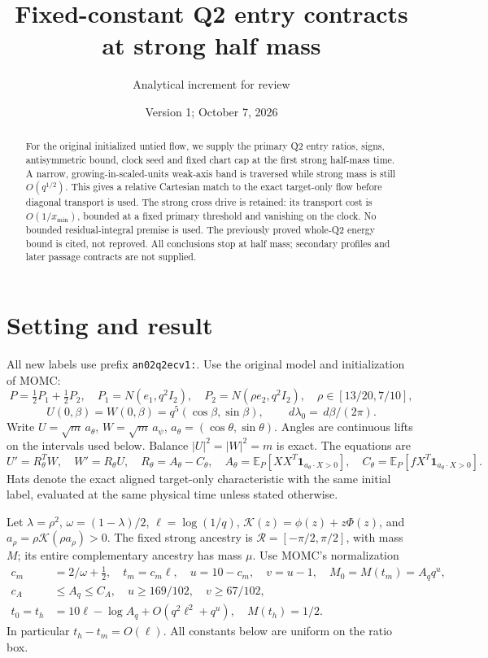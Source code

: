 \documentclass[11pt]{article}
\title{Fixed-constant Q2 entry contracts at strong half mass}
\author{Analytical increment for review}
\date{Version 1; October 7, 2026}
\theoremstyle{remark}\newtheorem{remark}[theorem]{Remark}
\newcommand{\dd}{\,d}
\newcommand{\E}{\mathbb E}
\newcommand{\one}{\mathbf1}
\newcommand{\Kfun}{\mathcal K}
\begin{document}
\maketitle
\begin{abstract}
For the original initialized untied flow, we supply the primary
Q2 entry ratios, signs, antisymmetric bound, clock seed and fixed
chart cap at the first strong half-mass time.
A narrow, growing-in-scaled-units weak-axis band is traversed while
strong mass is still $O(q^{1/2})$. This gives a relative Cartesian
match to the exact target-only flow before diagonal transport is
used. The strong cross drive is retained: its transport cost is
$O(1/x_{\min})$, bounded at a fixed primary threshold and vanishing
on the clock. No bounded residual-integral premise is used.
The previously proved whole-Q2 energy bound is cited, not reproved.
All conclusions stop at half mass; secondary profiles and later
passage contracts are not supplied.
\end{abstract}

\section{Setting and result}
All new labels use prefix \texttt{an02q2ecv1:}.
Use the original model and initialization of MOMC:
\[
 P=\tfrac12P_1+\tfrac12P_2,\quad
 P_1=N(e_1,q^2I_2),\quad P_2=N(\rho e_2,q^2I_2),\quad
 \rho\in[13/20,7/10],
\]
\[
 U(0,\beta)=W(0,\beta)=q^5(\cos\beta,\sin\beta),\qquad
 \dd\lambda_0=\dd\beta/(2\pi).
\]
Write $U=\sqrt m\,a_\theta$, $W=\sqrt m\,a_\psi$,
$a_\theta=(\cos\theta,\sin\theta)$.
Angles are continuous lifts on the intervals used below.
Balance $|U|^2=|W|^2=m$ is exact. The equations are
\[
 U'=R_\theta^TW,\quad W'=R_\theta U,\quad
 R_\theta=A_\theta-C_\theta,\quad
 A_\theta=\E_P[XX^T\one_{a_\theta\cdot X>0}],\quad
 C_\theta=\E_P[fX^T\one_{a_\theta\cdot X>0}].
\]
Hats denote the exact aligned target-only characteristic with
the same initial label, evaluated at the same physical time unless
stated otherwise.

Let $\lambda=\rho^2$, $\omega=(1-\lambda)/2$, $\ell=\log(1/q)$,
$\Kfun(z)=\phi(z)+z\Phi(z)$, and
$a_\rho=\rho\Kfun(\rho a_\rho)>0$.
The fixed strong ancestry is $\mathcal R=[-\pi/2,\pi/2]$,
with mass $M$; its entire complementary ancestry has mass $\mu$.
Use MOMC's normalization
\begin{align}
 c_m&=2/\omega+\tfrac12,\quad t_m=c_m\ell,\quad
 u=10-c_m,\quad v=u-1,\quad M_0=M(t_m)=A_q q^u,\nonumber\\
 c_A&\le A_q\le C_A,\quad u\ge169/102,\quad v\ge67/102,\nonumber\\
 t_0=t_h&=10\ell-\log A_q+O(q^2\ell^2+q^u),\quad M(t_h)=1/2.
 \label{an02q2ecv1:clock}
\end{align}
In particular $t_h-t_m=O(\ell)$.
All constants below are uniform on the ratio box.
\end{document}
